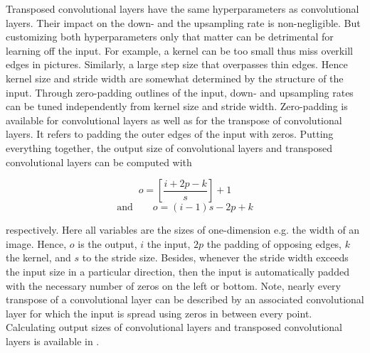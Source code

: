 Transposed convolutional layers have the same hyperparameters as convolutional layers. Their impact on the down- and the upsampling rate is non-negligible. But customizing both hyperparameters only that matter can be detrimental for learning off the input. For example, a kernel can be too small thus miss overkill edges in pictures. Similarly, a large step size that overpasses thin edges. Hence kernel size and stride width are somewhat determined by the structure of the input. Through zero-padding outlines of the input, down- and upsampling rates can be tuned independently from kernel size and stride width. Zero-padding is available for convolutional layers as well as for the transpose of convolutional layers. It refers to padding the outer edges of the input with zeros. Putting everything together, the output size of convolutional layers and transposed convolutional layers can be computed with
\vspace{-3.5ex}
\begin{multicols}{2}
	\noindent
	\begin{equation}
		o = \left[\frac{i+2p-k}{s}\right]+1  
	\end{equation}
	\begin{equation}
		\mathrm{and}\qquad o = (i-1)s - 2p + k
	\end{equation}
\end{multicols}
respectively. Here all variables are the sizes of one-dimension e.g. the width of an image. Hence, $o$ is the output, $i$ the input, $2p$ the padding of opposing edges, $k$ the kernel, and $s$ to the stride size. Besides, whenever the stride width exceeds the input size in a particular direction, then the input is automatically padded with the necessary number of zeros on the left or bottom. Note, nearly every transpose of a convolutional layer can be described by an associated convolutional layer for which the input is spread using zeros in between every point. Calculating output sizes of convolutional layers and transposed convolutional layers is available in \cite{dumoulin2018guide}.   
